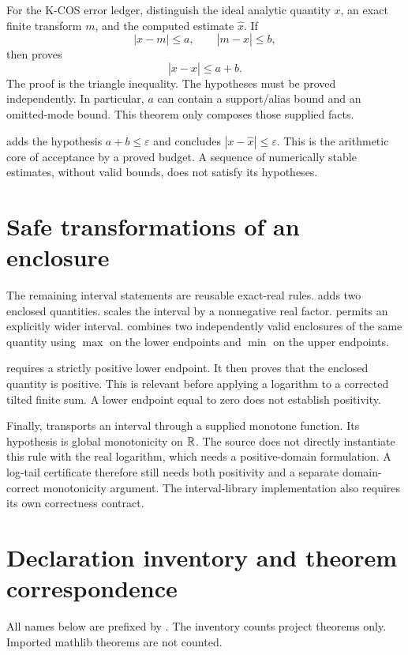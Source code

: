 For the K-COS error ledger, distinguish the ideal analytic quantity $x$, an
exact finite transform $m$, and the computed estimate $\widehat x$. If
\[
 |x-m|\le a,\qquad |m-\widehat x|\le b,
\]
then  proves
\[
 |x-\widehat x|\le a+b.
\]
The proof is the triangle inequality. The hypotheses must be proved
independently. In particular, $a$ can contain a support/alias bound and an
omitted-mode bound. This theorem only composes those supplied facts.

 adds the hypothesis $a+b\le\varepsilon$ and concludes
$|x-\widehat x|\le\varepsilon$. This is the arithmetic core of acceptance by a
proved budget. A sequence of numerically stable estimates, without valid
bounds, does not satisfy its hypotheses.

\section{Safe transformations of an enclosure}

The remaining interval statements are reusable exact-real rules.
 adds two enclosed quantities.
 scales the interval by a nonnegative real factor.
 permits an explicitly wider interval.
 combines two independently valid enclosures of the
same quantity using $\max$ on the lower endpoints and $\min$ on the upper
endpoints.

 requires a strictly positive lower endpoint. It then
proves that the enclosed quantity is positive. This is relevant before
applying a logarithm to a corrected tilted finite sum. A lower endpoint equal
to zero does not establish positivity.

Finally,  transports an interval through a supplied
monotone function. Its hypothesis is global monotonicity on $\mathbb R$. The source
does not directly instantiate this rule with the real logarithm, which needs
a positive-domain formulation. A log-tail certificate therefore still needs
both positivity and a separate domain-correct monotonicity argument. The
interval-library implementation also requires its own correctness contract.

\section{Declaration inventory and theorem correspondence}

All names below are prefixed by . The inventory counts
project theorems only. Imported mathlib theorems are not counted.


